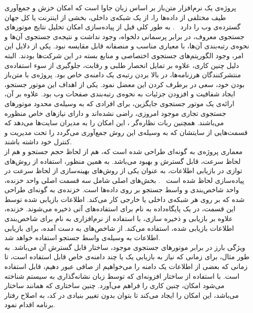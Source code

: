 
پروژه‌ی  یک نرم‌افزار متن‌باز بر اساس زبان جاوا است که امکان خزش و جمع‌آوری طیف مختلفی از داده‌ها را، از یک شبکه‌ی داخلی، بخشی از اینترنت یا کل جهان گسترده‌ی وب را دارد
~\cite{Nutch-java}.
به طور کلی قبل از پیاده‌سازی  امکان تحلیل نتایج موتورهای جستجوی معروف، در برابر پرسمانی دلخواه، وجود نداشت و نتیجه‌ی جستجوی آن‌ها و نحوه‌ی رتبه‌بندی آن‌ها، با معیاری مناسب و منصفانه قابل مقایسه نبود. یکی از دلایل این امر، وجود الگوریتم‌های جستجوی اختصاصی و منابع بسته در این شرکت‌ها بودند. البته دلیل چنین کاری، علاوه بر تمایل انحصار طلبی و رقابت، جلوگیری از سوء استفاده‌ی منتشرکنندگان هرزنامه‌ها، در بالا بردن رتبه‌ی یک دامنه‌ی خاص بود. پروژه‌ی  با متن‌باز بودن خود، سعی در برطرف کردن این معضل نمود. یکی از اهداف این موتور جستجو، ایجاد شفافیت و افزودن جزئیات به نحوه‌ی رتبه‌بندی صفحات وب بود. علاوه بر آن، ارائه‌ی یک موتور جستجوی جایگزین، برای افرادی که به وسیله‌ی محدود موتورهای جستجوی تجاری موجود امروزی، راضی نشده‌اند و دارای نیازهای خاص منظوره می‌باشند. همچنین ربات نظاره‌گر ، این امکان را به مدیران سایت‌ها می‌دهد که قسمت‌هایی از سایتشان که به وسیله‌ی این روش جمع‌آوری می‌گردد را تحت مدیریت و کنترل خود داشته باشند.
\\
معماری پروژه‌ی  به گونه‌ای طراحی شده است که، هم از لحاظ حجم جستجو و هم از لحاظ سرعت، قابل گسترش و بهبود می‌باشد. به همین منظور، استفاده از روش‌های توازی در بازیابی اطلاعات، به عنوان یکی از روش‌های بهینه‌سازی از لحاظ سرعت در پیاده‌سازی لحاظ شده است
~\cite{Nutch-java}.
بخش‌های اصلی  شامل سه قسمت اصلی واحد خزنده، واحد شاخص‌بندی و واسط جستجو بر روی داده‌ها است. خزنده‌ی  به گونه‌ای طراحی شده که بر روی هر شبکه‌ی داخلی یا خارجی کار می‌کند. اطلاعات بازیابی شده توسط این قسمت، در یک پایگاه‌داده به نام  برای استفاده‌های آتی ذخیره می‌شوند. خزنده، علاوه بر بازیابی و ذخیره سازی، با استفاده از نرم‌افزاری به نام  برای شاخص‌بندی اطلاعات بازیابی شده، استفاده می‌کند. از شاخص‌های به دست آمده، برای بازیابی اطلاعات به وسیله‌ی واسط جستجو استفاده خواهد شد.
\\ویژگی بارز  در برابر موتورهای جستجوی موجود، ساختار قابل گسترش آن می‌باشد. به طور مثال،  برای زمانی که نیاز به بازیابی یک یا چند دامنه‌ی خاص قابل استفاده است، تا زمانی که بعضی از اطلاعات یک دامنه را می‌خواهیم از صافی عبور دهیم، قابل استفاده است.  با استفاده از ساختار افزونه‌ای که توسط زبان نشانه‌گذاری به سیستم شناخته می‌شود امکان، چنین کاری را فراهم می‌آورد. چنین ساختاری که همانند ساختار  می‌باشد، این امکان را ایجاد می‌کند تا بتوان بدون تغییر بنیادی در کد، به اصلاح رفتار برنامه اقدام نمود.

